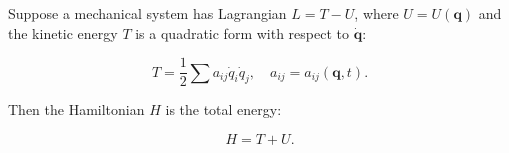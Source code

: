 Suppose a mechanical system has Lagrangian $L = T - U$, where $U = U(\mathbf{q})$ and the kinetic energy $T$ is a quadratic form with respect to $\dot{\mathbf{q}}$:

$$T = \frac{1}{2} \sum a_{ij} \dot{q}_i \dot{q}_j, \quad a_{ij} = a_{ij}(\mathbf{q}, t).$$

Then the Hamiltonian $H$ is the total energy:

$$H = T + U.$$
